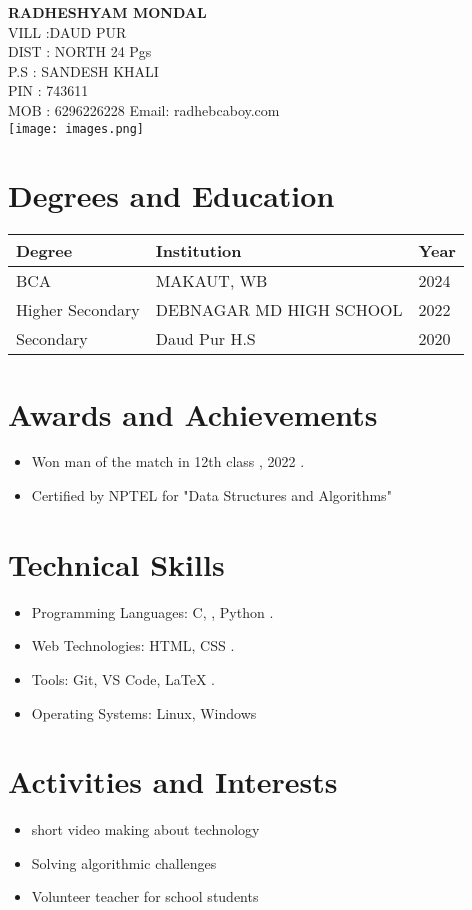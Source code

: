 \documentclass[12pt]{article}
\begin{document}
\begin{center}
    \Huge \textbf{RADHESHYAM MONDAL} \\
    \normalsize
    VILL :DAUD PUR  \\
    DIST : NORTH 24 Pgs   \\
    P.S : SANDESH KHALI \\
    PIN : 743611 \\
    MOB : 6296226228
     \quad Email: radhebcaboy.com \\
    \vspace{0.5cm}
    \texttt{[image: images.png]} %
\end{center}

\section*{Degrees and Education}
\begin{tabular}{|p{4cm}|p{4cm}|p{4cm}|}
    \hline
    Degree & Institution & Year \\
    \hline
    BCA & MAKAUT, WB & 2024 \\
    Higher Secondary & DEBNAGAR MD HIGH SCHOOL  & 2022 \\
    Secondary &Daud Pur H.S & 2020 \\
    \hline
\end{tabular}

\section*{Awards and Achievements}
\begin{itemize}[noitemsep]
    \item Won man of the match in 12th class , 2022 . 
    \item Certified by NPTEL for "Data Structures and Algorithms"
    
\end{itemize}

\section*{Technical Skills}
\begin{itemize}[noitemsep]
    \item Programming Languages: C, , Python . 
    \item Web Technologies: HTML, CSS .
    \item Tools: Git, VS Code, LaTeX .
    \item Operating Systems: Linux, Windows
\end{itemize}

\section*{Activities and Interests}
\begin{itemize}[noitemsep]
    \item short video making  about technology
    \item Solving algorithmic challenges 
    \item Volunteer teacher for school students
\end{itemize}
\end{document}
